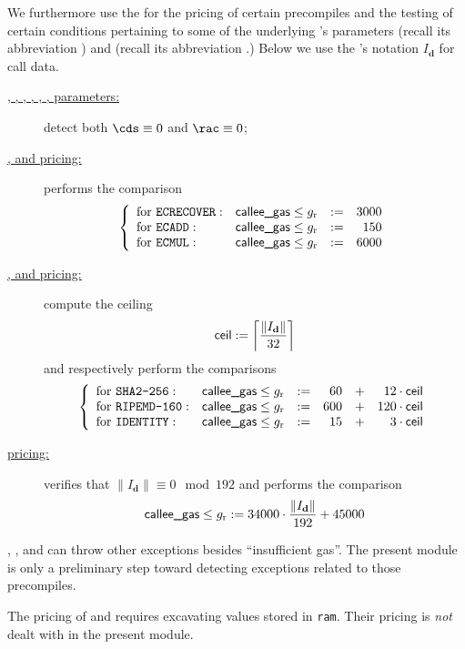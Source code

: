 We furthermore use the \oobMod{} for the pricing of certain precompiles and the testing of certain conditions pertaining to some of the underlying 's parameters
\CDS{} (recall its abbreviation \cds{}) and
\RAC{} (recall its abbreviation \rac{}.)
\saNote{} Below we use the \cite{EYP}'s notation $I_\textbf{d}$ for call data.
\begin{description}
	\item[\underline{, , , , , ,  parameters:}]
		detect both $\cds \equiv 0$ and $\rac \equiv 0$; 
	\item[\underline{,  and  pricing:}]
		performs the comparison
		\[
			\left\{ \begin{array}{llcrcl}
				\text{for }\texttt{ECRECOVER}   : & \textsf{callee\_gas} \leq g_\text{r} & := & 3000 \\
				\text{for }\texttt{ECADD}       : & \textsf{callee\_gas} \leq g_\text{r} & := &  150 \\
				\text{for }\texttt{ECMUL}       : & \textsf{callee\_gas} \leq g_\text{r} & := & 6000 \\
			\end{array} \right.
		\]
	\item[\underline{,  and  pricing:}]
		compute the ceiling
		\[ \textsf{ceil} := \left \lceil \frac{\| I_\textbf{d} \|}{32} \right \rceil \]
		and respectively perform the comparisons
		\[
			\left\{ \begin{array}{llcrcr}
				\text{for }\texttt{SHA2-256}   : & \textsf{callee\_gas} \leq g_\text{r} & := & 60  & + & 12  \cdot \textsf{ceil}  \\
				\text{for }\texttt{RIPEMD-160} : & \textsf{callee\_gas} \leq g_\text{r} & := & 600 & + & 120 \cdot \textsf{ceil}  \\
				\text{for }\texttt{IDENTITY}   : & \textsf{callee\_gas} \leq g_\text{r} & := & 15  & + & 3   \cdot \textsf{ceil}  \\
			\end{array} \right.
		\]
	\item[\underline{ pricing:}]
		verifies that $\| I_\textbf{d} \| \equiv 0 \mod 192$ and performs the comparison 
		\[ \textsf{callee\_gas} \leq g_\text{r} := 34000 \cdot \frac{\| I_\textbf{d} \|}{192} + 45000 \]
\end{description}

\saNote{}
, ,  and  can throw other exceptions besides ``insufficient gas''.
The present module is only a preliminary step toward detecting exceptions related to those precompiles.

\saNote{} The pricing of  and  requires excavating values stored in \texttt{ram}. Their pricing is \emph{not} dealt with in the present module. 

